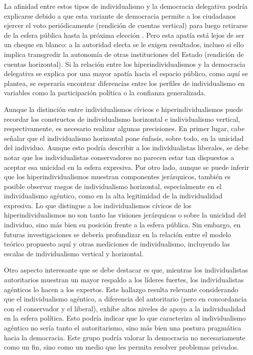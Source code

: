 \documentclass[12pt,twoside]{templates/facsothesis}
\begin{document}
La afinidad entre estos tipos de individualismo y la democracia delegativa podría explicarse debido a que esta variante de democracia permite a los ciudadanos ejercer el voto periódicamente (rendición de cuentas vertical) para luego retirarse de la esfera pública hasta la próxima elección \citep{peruzzotti2008}. Pero esta apatía está lejos de ser un cheque en blanco: a la autoridad electa se le exigen resultados, incluso si ello implica transgredir la autonomía de otras instituciones del Estado (rendición de cuentas horizontal). Si la relación entre los hiperindividualismos y la democracia delegativa se explica por una mayor apatía hacia el espacio público, como aquí se plantea, se esperaría encontrar diferencias entre los perfiles de individualismo en variables como la participación política o la confianza generalizada.

Aunque la distinción entre individualismos cívicos e hiperindividualismos puede recordar los constructos de individualismo horizontal e individualismo vertical, respectivamente, es necesario realizar algunas precisiones. En primer lugar, cabe señalar que el individualismo horizontal pone énfasis, sobre todo, en la unicidad del individuo. Aunque esto podría describir a los individualistas liberales, se debe notar que los individualistas conservadores no parecen estar tan dispuestos a aceptar esa unicidad en la esfera expresiva. Por otro lado, aunque se puede inferir que los hiperindividualismos muestran componentes jerárquicos, también es posible observar rasgos de individualismo horizontal, especialmente en el individualismo agéntico, como en la alta legitimidad de la individualidad expresiva. Lo que distingue a los individualismos cívicos de los hiperindividualismos no son tanto las visiones jerárquicas o sobre la unicidad del individuo, sino más bien su posición frente a la esfera pública. Sin embargo, en futuras investigaciones se debería profundizar en la relación entre el modelo teórico propuesto aquí y otras mediciones de individualismo, incluyendo las escalas de individualismo vertical y horizontal.

Otro aspecto interesante que se debe destacar es que, mientras los individualistas autoritarios muestran un mayor respaldo a los líderes fuertes, los individualistas agénticos lo hacen a los expertos. Este hallazgo resulta relevante considerando que el individualismo agéntico, a diferencia del autoritario (pero en concordancia con el conservador y el liberal), exhibe altos niveles de apoyo a la individualidad en la esfera política. Esto podría indicar que lo que caracteriza al individualismo agéntico no sería tanto el autoritarismo, sino más bien una postura pragmática hacia la democracia. Este grupo podría valorar la democracia no necesariamente como un fin, sino como un medio que les permita resolver problemas privados.
\end{document}

